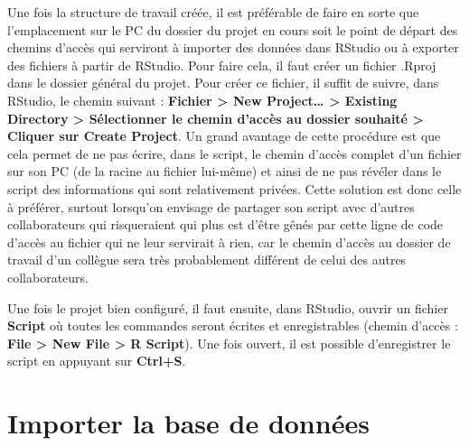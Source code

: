 \documentclass[
]{book}
\begin{document}
Une fois la structure de travail créée, il est préférable de faire en sorte que l'emplacement sur le PC du dossier du projet en cours soit le point de départ des chemins d'accès qui serviront à importer des données dans RStudio ou à exporter des fichiers à partir de RStudio. Pour faire cela, il faut créer un fichier .Rproj dans le dossier général du projet. Pour créer ce fichier, il suffit de suivre, dans RStudio, le chemin suivant : \textbf{Fichier \textgreater{} New Project\ldots{} \textgreater{} Existing Directory \textgreater{} Sélectionner le chemin d'accès au dossier souhaité \textgreater{} Cliquer sur Create Project}. Un grand avantage de cette procédure est que cela permet de ne pas écrire, dans le script, le chemin d'accès complet d'un fichier sur son PC (de la racine au fichier lui-même) et ainsi de ne pas révéler dans le script des informations qui sont relativement privées. Cette solution est donc celle à préférer, surtout lorsqu'on envisage de partager son script avec d'autres collaborateurs qui risqueraient qui plus est d'être gênés par cette ligne de code d'accès au fichier qui ne leur servirait à rien, car le chemin d'accès au dossier de travail d'un collègue sera très probablement différent de celui des autres collaborateurs.

Une fois le projet bien configuré, il faut ensuite, dans RStudio, ouvrir un fichier \textbf{Script} où toutes les commandes seront écrites et enregistrables (chemin d'accès : \textbf{File \textgreater{} New File \textgreater{} R Script}). Une fois ouvert, il est possible d'enregistrer le script en appuyant sur \textbf{Ctrl+S}.

\hypertarget{importer-la-base-de-donnuxe9es}{%
\section{Importer la base de données}\label{importer-la-base-de-donnuxe9es}}
\end{document}
